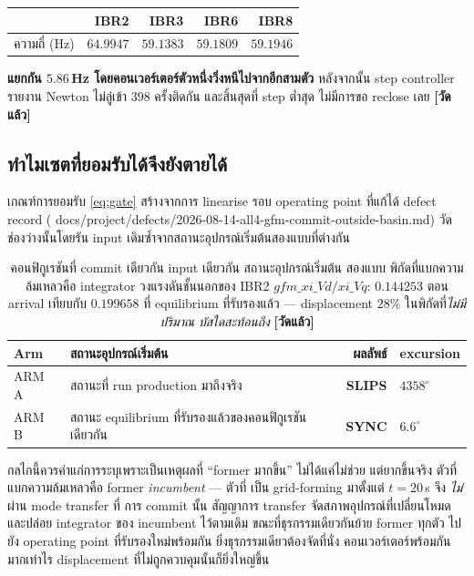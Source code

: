 \documentclass[12pt,a4paper]{article}
\theoremstyle{remark}
\newcommand{\code}[1]{{\ttfamily\small\hyphenchar\font=-1 #1}}
\newcommand{\measured}{\textcolor{ok}{\textbf{[วัดแล้ว]}}}
\begin{document}
\begin{center}\small
\begin{tabular}{@{}lrrrr@{}}
\toprule
& IBR2 & IBR3 & IBR6 & IBR8\\
\midrule
ความถี่ (Hz) & $\mathbf{64.9947}$ & $59.1383$ & $59.1809$ & $59.1946$\\
\bottomrule
\end{tabular}
\end{center}

\noindent
\textbf{แยกกัน $5.86$\,Hz โดยคอนเวอร์เตอร์ตัวหนึ่งวิ่งหนีไปจากอีกสามตัว}
หลังจากนั้น step controller รายงาน Newton ไม่ลู่เข้า $398$ ครั้งติดกัน
และสิ้นสุดที่ step ต่ำสุด ไม่มีการขอ reclose เลย \measured

\subsection{ทำไมเซตที่ยอมรับได้จึงยังตายได้}

เกณฑ์การยอมรับ \eqref{eq:gate} สร้างจากการ linearise รอบ operating point
ที่แก้ได้ defect record
(\code{docs/project/defects/2026-08-14-all4-gfm-commit-outside-basin.md})
วัดช่องว่างนั้นโดยรัน input เดิมซ้ำจากสถานะอุปกรณ์เริ่มต้นสองแบบที่ต่างกัน

\begin{table}[H]
\centering
\small
\begin{tabular}{@{}llrl@{}}
\toprule
\textbf{Arm} & \textbf{สถานะอุปกรณ์เริ่มต้น} & \textbf{ผลลัพธ์} & \textbf{excursion}\\
\midrule
ARM A & สถานะที่ run production มาถึงจริง & \textcolor{no}{\textbf{SLIPS}} & $4358^{\circ}$\\
ARM B & สถานะ equilibrium ที่รับรองแล้วของคอนฟิกูเรชันเดียวกัน & \textbf{SYNC} & $6.6^{\circ}$\\
\bottomrule
\end{tabular}
\caption{คอนฟิกูเรชันที่ commit เดียวกัน input เดียวกัน สถานะอุปกรณ์เริ่มต้น
สองแบบ พิกัดที่แบกความล้มเหลวคือ integrator วงแรงดันชั้นนอกของ IBR2
$gfm\_xi\_Vd/xi\_Vq$: $0.144253$ ตอน arrival เทียบกับ $0.199658$ ที่
equilibrium ที่รับรองแล้ว --- displacement $28\%$ ในพิกัดที่\emph{ไม่มีปริมาณ
บัสใดสะท้อนถึง} \measured}
\label{tab:arm}
\end{table}

กลไกนี้ควรค่าแก่การระบุเพราะเป็นเหตุผลที่ ``former มากขึ้น'' ไม่ได้แค่ไม่ช่วย
แต่ยากขึ้นจริง ตัวที่แบกความล้มเหลวคือ former \emph{ incumbent } --- ตัวที่
เป็น grid-forming มาตั้งแต่ $t=20$\,s จึง \emph{ไม่} ผ่าน mode transfer ที่
การ commit นั้น สัญญาการ transfer จัดสภาพอุปกรณ์ที่เปลี่ยนโหมดและปล่อย
integrator ของ incumbent ไว้ตามเดิม ขณะที่ธุรกรรมเดียวกันย้าย former ทุกตัว
ไปยัง operating point ที่รับรองใหม่พร้อมกัน ยิ่งธุรกรรมเดียวต้องจัดที่นั่ง
คอนเวอร์เตอร์พร้อมกันมากเท่าไร displacement ที่ไม่ถูกควบคุมนั้นก็ยิ่งใหญ่ขึ้น
\end{document}
